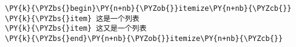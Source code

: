\begin{Verbatim}[commandchars=\\\{\}]
\PY{k}{\PYZbs{}begin}\PY{n+nb}{\PYZob{}}itemize\PY{n+nb}{\PYZcb{}}
\PY{k}{\PYZbs{}item} 这是一个列表
\PY{k}{\PYZbs{}item} 这又是一个列表
\PY{k}{\PYZbs{}end}\PY{n+nb}{\PYZob{}}itemize\PY{n+nb}{\PYZcb{}}
\end{Verbatim}

